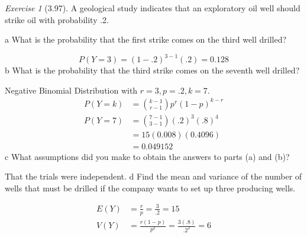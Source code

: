\documentclass[12pt]{amsart}
\makeatletter
\theoremstyle{remark}
\newtheorem*{exercise}{Exercise}%
\renewenvironment{proof}[1][\proofname]{\par\doublespacing
  \pushQED{\qed}%
  \normalfont \topsep6\p@\@plus6\p@\relax
  \list{}{%
    \settowidth{\leftmargin}{\itshape\proofname:\hskip\labelsep}%
    \setlength{\labelwidth}{0pt}%
    \setlength{\itemindent}{-\leftmargin}%
  }%
  \item[\hskip\labelsep\itshape#1\@addpunct{:}]\ignorespaces
}{%
  \popQED\endlist\@endpefalse
  \singlespacing
}
\theoremstyle{mycomment}
\makeatother
\begin{document}
\begin{exercise}[3.97] A geological study indicates that an exploratory oil well should strike oil with probability .2.

a
What is the probability that the first strike comes on the third well drilled?
\begin{proof}[Solution]
  $$P(Y=3) = (1-.2)^{3-1}(.2) = 0.128 $$
\end{proof}
b
What is the probability that the third strike comes on the seventh well drilled?
\begin{proof}[Solution]
  Negative Binomial Distribution with $r = 3, p =.2, k = 7$.
  \begin{align*}
    P(Y=k) &= {k-1 \choose r-1}p^r(1-p)^{k-r} \\
    P(Y=7) &= {7-1 \choose 3-1}(.2)^3(.8)^4 \\
           &= 15(0.008)(0.4096) \\
           &= 0.049152
  \end{align*}
\end{proof}
c
What assumptions did you make to obtain the answers to parts (a) and (b)?
\begin{proof}[Solution]
That the trials were independent.
\end{proof}
d
Find the mean and variance of the number of wells that must be drilled if the company
wants to set up three producing wells.
\begin{proof}[Solution]
  \begin{align*}
    E(Y) &= \frac{r}{p} = \frac{3}{.2} = 15 \\
    V(Y) &= \frac{r(1-p)}{p^2} = \frac{3(.8)}{.2^2} = 6 
  \end{align*}
\end{proof}
\end{exercise}
\end{document}
